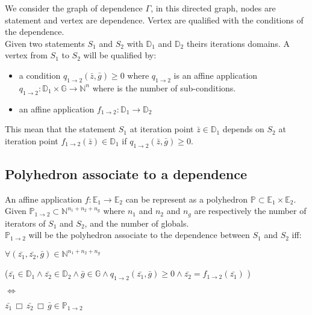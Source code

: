 We consider the graph of dependence $\Gamma$, in this directed graph, nodes are statement and vertex are dependence.
Vertex are qualified with the conditions of the dependence.\\
Given two statements $S_{1}$ and $S_{2}$ with $\mathbb{D}_{1}$ and $\mathbb{D}_{2}$ theirs iterations domains.
A vertex from $S_{1}$ to $S_{2}$ will be qualified by:
\begin{itemize}
	\item a condition $q_{1 \rightarrow 2}(\bar{z}, \bar{g}) \geq 0$ where $q_{1 \rightarrow 2}$ is an affine application
		$q_{1 \rightarrow 2}: \mathbb{D}_{1} \times \mathbb{G} \rightarrow \mathbb{N}^{n}$ where is the number of
		sub-conditions.
	\item an affine application $f_{1 \rightarrow 2} : \mathbb{D}_{1} \rightarrow \mathbb{D}_{2}$
\end{itemize}
This mean that the statement $S_{1}$ at iteration point $\bar{z} \in \mathbb{D}_{1}$ depends on $S_{2}$ at iteration point
$f_{1 \rightarrow 2}(\bar{z}) \in \mathbb{D}_{1}$ if $q_{1 \rightarrow 2}(\bar{z}, \bar{g}) \geq 0$.\\

		\subsection{Polyhedron associate to a dependence}

An affine application $f: \mathbb{E}_{1} \rightarrow \mathbb{E}_{2}$ can be represent as a polyhedron
$\mathbb{P} \subset \mathbb{E}_{1} \times \mathbb{E}_{2}$.\\
Given $\mathbb{P}_{1 \rightarrow 2} \subset \mathbb{N}^{n_{1} + n_{2} + n_{g}}$ where $n_{1}$ and $n_{2}$ and $n_{g}$ are
respectively the number of iterators of $S_{1}$ and $S_{2}$, and the number of globals.\\

$\mathbb{P}_{1 \rightarrow 2}$ will be the polyhedron associate to the dependence between $S_{1}$ and $S_{2}$ iff:
%
%
%
\begin{center}
$\forall (\bar{z_{1}}, \bar{z_{2}}, \bar{g}) \in \mathbb{N}^{n_{1} + n_{2} + n_{g}}$

($\bar{z_{1}} \in \mathbb{D}_{1} \wedge \bar{z_{2}} \in \mathbb{D}_{2} \wedge \bar{g} \in \mathbb{G} \wedge q_{1 \rightarrow 2}(\bar{z_{1}}, \bar{g}) \geq 0 \wedge \bar{z_{2}} = f_{1 \rightarrow 2}(\bar{z_{1}})$ )

$\Leftrightarrow$

$ \bar{z_{1}} \,\Box\, \bar{z_{2}} \,\Box\, \bar{g} \in \mathbb{P}_{1 \rightarrow 2}$
\end{center}

